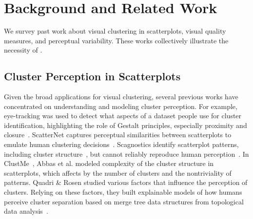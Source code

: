 \section{Background and Related Work}
We survey past work about visual clustering in scatterplots,  visual quality measures, and perceptual variability. 
These works collectively illustrate the necessity of \measure.

\subsection{Cluster Perception in Scatterplots}

\label{sec:cps}


Given the 
broad applications for visual clustering,
several previous works have concentrated on understanding and modeling cluster perception.
% 
For example, eye-tracking 
was used to detect what aspects of a dataset people use for
cluster identification, highlighting the role of Gestalt principles, especially proximity and closure~\cite{etemadpour2014eye}. 
ScatterNet captures perceptual similarities between scatterplots to emulate human clustering decisions~\cite{ma2018scatternet}. 
Scagnostics identify scatterplot patterns, including cluster structure~\cite{dang2014transforming}, but 
cannot reliably reproduce human perception~\cite{pandey2016towards}. 
In ClustMe~\cite{abbas19cgf},
Abbas et al. 
 modeled  complexity of the cluster structure in scatterplots, which affects by the number of clusters and the nontriviality of patterns.
Quadri \& Rosen studied various factors that influence the perception of clusters. Relying on these factors, they built explainable models of how humans perceive cluster separation based on merge tree data structures from topological data analysis~\cite{quadri21tvcg}.

